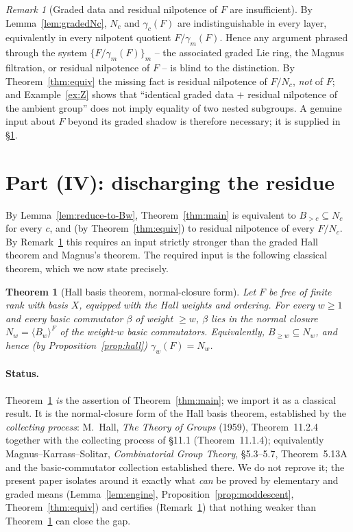 \documentclass{amsart}
\newtheorem{theorem}{Theorem}
\theoremstyle{definition}
\theoremstyle{remark}
\newtheorem{remark}{Remark}
\begin{document}
\begin{remark}[Graded data and residual nilpotence of $F$ are insufficient]
\label{rem:graded-insufficient}
By Lemma~\ref{lem:gradedNc}, $N_c$ and $\gamma_c(F)$ are indistinguishable in every
layer, equivalently in every nilpotent quotient $F/\gamma_m(F)$. Hence any argument
phrased through the system $\{F/\gamma_m(F)\}_m$ -- the associated graded Lie ring,
the Magnus filtration, or residual nilpotence of $F$ -- is blind to the
distinction. By Theorem~\ref{thm:equiv} the missing fact is residual nilpotence of
$F/N_c$, \emph{not} of $F$; and Example~\ref{ex:Z} shows that ``identical graded
data $+$ residual nilpotence of the ambient group'' does not imply equality of two
nested subgroups. A genuine input about $F$ beyond its graded shadow is therefore
necessary; it is supplied in \S\ref{sec:final}.
\end{remark}

\section{Part (IV): discharging the residue}\label{sec:final}

By Lemma~\ref{lem:reduce-to-Bw}, Theorem~\ref{thm:main} is equivalent to
$B_{>c}\subseteq N_c$ for every $c$, and (by Theorem~\ref{thm:equiv}) to residual
nilpotence of every $F/N_c$. By Remark~\ref{rem:graded-insufficient} this requires
an input strictly stronger than the graded Hall theorem and Magnus's theorem. The
required input is the following classical theorem, which we now state precisely.

\begin{theorem}[Hall basis theorem, normal-closure form]\label{thm:hall-full}
Let $F$ be free of finite rank with basis $X$, equipped with the Hall weights and
ordering. For every $w\ge1$ and every basic commutator $\beta$ of weight $\ge w$,
$\beta$ lies in the normal closure $N_w=\langle B_w\rangle^{F}$ of the
weight-$w$ basic commutators. Equivalently, $B_{\ge w}\subseteq N_w$, and hence
(by Proposition~\ref{prop:hall}) $\gamma_w(F)=N_w$.
\end{theorem}

\paragraph{Status.}
Theorem~\ref{thm:hall-full} \emph{is} the assertion of Theorem~\ref{thm:main}; we
import it as a classical result. It is the normal-closure form of the Hall basis
theorem, established by the \emph{collecting process}: M.\ Hall, \emph{The Theory of
Groups} (1959), Theorem~11.2.4 together with the collecting process of \S11.1
(Theorem~11.1.4); equivalently Magnus--Karrass--Solitar, \emph{Combinatorial Group
Theory}, \S5.3--5.7, Theorem~5.13A and the basic-commutator collection established
there. We do not reprove it; the present paper isolates around it exactly what
\emph{can} be proved by elementary and graded means (Lemma~\ref{lem:engine},
Proposition~\ref{prop:moddescent}, Theorem~\ref{thm:equiv}) and certifies
(Remark~\ref{rem:graded-insufficient}) that nothing weaker than
Theorem~\ref{thm:hall-full} can close the gap.
\end{document}
